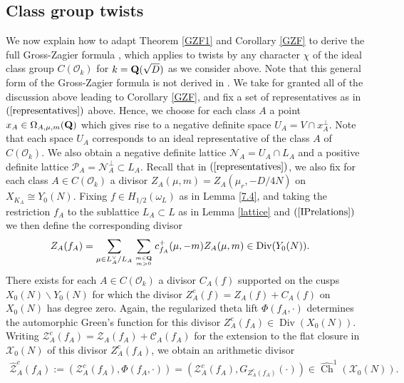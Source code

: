 \documentclass{amsart}
\theoremstyle{definition}
\theoremstyle{definition}
\theoremstyle{definition}
\begin{document}
\subsection{Class group twists}\label{twisted}

We now explain how to adapt Theorem \ref{GZF1} and Corollary \ref{GZF} to derive the full Gross-Zagier formula \cite[I Theorem (6.3)]{GZ}, 
which applies to twists by any character $\chi$ of the ideal class group $C(\mathcal{O}_k)$ for $k = {\bf{Q}}(\sqrt{D})$ as we consider above. 
Note that this general form of the Gross-Zagier formula is not derived in \cite{BY}. 
We take for granted all of the discussion above leading to Corollary \ref{GZF}, 
and fix a set of representatives as in $(\ref{representatives})$ above. 
Hence, we choose for each class $A$ a point $x_A \in \Omega_{A, \mu, m}({\bf{Q}})$ 
which gives rise to a negative definite space $U_A = V \cap x_A^{\perp}$.
Note that each space $U_A$ corresponds to an ideal representative of the class $A$ of $C(\mathcal{O}_k)$. 
We also obtain a negative definite lattice $\mathcal{N}_A = U_A \cap L_A$ 
and a positive definite lattice $\mathcal{P}_A = \mathcal{N}_A^{\perp} \subset L_A$. 
Recall that in $(\ref{representatives})$, we also fix for each class $A \in C(\mathcal{O}_k)$
a divisor $Z_A(\mu, m) = Z_A(\mu_r, - D/4N)$ on $X_{K_A} \cong Y_0(N)$. 
Fixing $f \in H_{1/2}(\omega_L)$ as in Lemma \ref{7.4}, and taking the restriction $f_A$ to the sublattice 
$L_A \subset L$ as in Lemma \ref{lattice} and $(\ref{IPrelations})$ we then define the corresponding divisor %
\begin{align*}Z_A(f_A) 
&= \sum\limits_{ \mu \in L_A^{\vee}/L_A } \sum\limits_{m \in {\bf{Q}} \atop m >0} c_{f_A}^+(\mu, -m) Z_A(\mu, m) \in \operatorname{Div}(Y_0(N)).\end{align*}
There exists for each $A \in C(\mathcal{O}_k)$ a divisor $C_A(f)$ supported on the cusps $X_0(N) \backslash Y_0(N)$ for which the divisor
$Z_A^c(f) = Z_A(f) + C_A(f)$ on $X_0(N)$ has degree zero. Again, the regularized theta lift $\Phi(f_A, \cdot)$ determines the automorphic
Green's function for this divisor $Z_A^c(f_A) \in \operatorname{Div}(X_0(N))$. Writing $\mathcal{Z}_A^c(f_A) = \mathcal{Z}_A(f_A) + \mathcal{C}_A(f_A)$
for the extension to the flat closure in $\mathcal{X}_0(N)$ of this divisor $Z_A^c(f_A)$, we obtain an arithmetic divisor 
\begin{align*}\widehat{\mathcal{Z}}^c_A(f_A) := (\mathcal{Z}_A^c(f_A), \Phi(f_A, \cdot)) = (\mathcal{Z}_A^c(f_A), G_{Z_A^c(f_A)}(\cdot)) \in \widehat{\operatorname{Ch}}^1(\mathcal{X}_0(N)).\end{align*}
\end{document}
